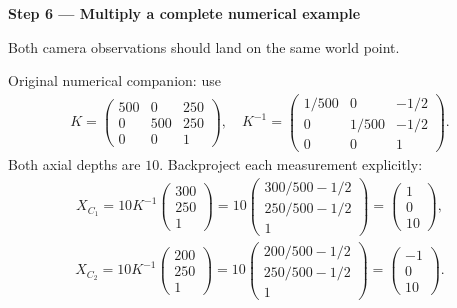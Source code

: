 \documentclass[letterpaper,11pt,english,openany,oneside]{jupyterBook}
\begin{document}
\par

\par\medskip{}
{\color{QuizStepRed}\bfseries Step 6 — Multiply a complete numerical example}\par\smallskip

\sphinxAtStartPar
{} Both camera observations should land on the same world point.

\sphinxAtStartPar
Original numerical companion: use
{\color{QuizMathBlue} \begin{equation*}
\begin{split}
K=\begin{pmatrix}500&0&250\\0&500&250\\0&0&1\end{pmatrix},\quad
K^{-1}=\begin{pmatrix}1/500&0&-1/2\\0&1/500&-1/2\\0&0&1\end{pmatrix}.
\end{split}
\end{equation*}}
\sphinxAtStartPar
Both axial depths are {\color{QuizMathBlue} \(10\)}. Backproject each measurement explicitly:
{\color{QuizMathBlue} \begin{equation*}
\begin{split}
X_{C_1}=10K^{-1}\begin{pmatrix}300\\250\\1\end{pmatrix}
=10\begin{pmatrix}300/500-1/2\\250/500-1/2\\1\end{pmatrix}
=\begin{pmatrix}1\\0\\10\end{pmatrix},
\end{split}
\end{equation*}}{\color{QuizMathBlue} \begin{equation*}
\begin{split}
X_{C_2}=10K^{-1}\begin{pmatrix}200\\250\\1\end{pmatrix}
=10\begin{pmatrix}200/500-1/2\\250/500-1/2\\1\end{pmatrix}
=\begin{pmatrix}-1\\0\\10\end{pmatrix}.
\end{split}
\end{equation*}}
\end{document}
